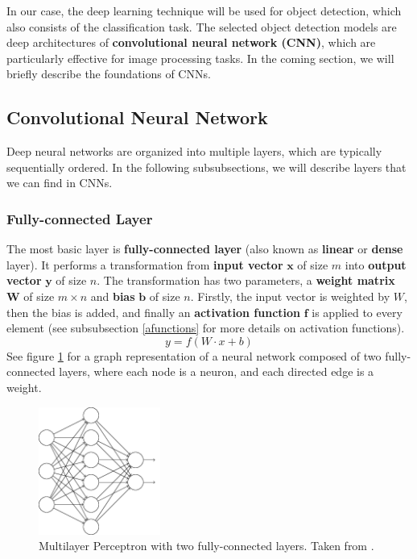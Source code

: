 In our case, the deep learning technique will be used for object detection, which also consists of the classification task. The selected object detection models are deep architectures of \textbf{convolutional neural network (CNN)}, which are particularly effective for image processing tasks. In the coming section, we will briefly describe the foundations of CNNs. 

\subsection{Convolutional Neural Network}
Deep neural networks are organized into multiple layers, which are typically sequentially ordered. In the following subsubsections, we will describe layers that we can find in CNNs.

\subsubsection{Fully-connected Layer}
The most basic layer is \textbf{fully-connected layer} (also known as \textbf{linear} or \textbf{dense} layer). It performs a transformation from \textbf{input vector} $\boldsymbol{x}$ of size $m$ into \textbf{output vector} $\boldsymbol{y}$ of size $n$. The transformation has two parameters, a \textbf{weight matrix} $\boldsymbol{W}$ of size $m \times n$ and \textbf{bias} $\boldsymbol{b}$ of size $n$. Firstly, the input vector is weighted by $W$, then the bias is added, and finally an \textbf{activation function} $\boldsymbol{f}$ is applied to every element (see subsubsection \ref{afunctions} for more details on activation functions).
$$
y = f(W\cdot x + b)
$$
See figure \ref{fig:fcl} for a graph representation of a neural network composed of two fully-connected layers, where each node is a neuron, and each directed edge is a weight.

\begin{figure}[h]
    \centering
    \includegraphics[width=4cm]{Sources/Figures/fully_connected_layer.png}
    \caption{Multilayer Perceptron with two fully-connected layers. Taken from \cite{nielsenneural}.}
    \label{fig:fcl}
\end{figure}

